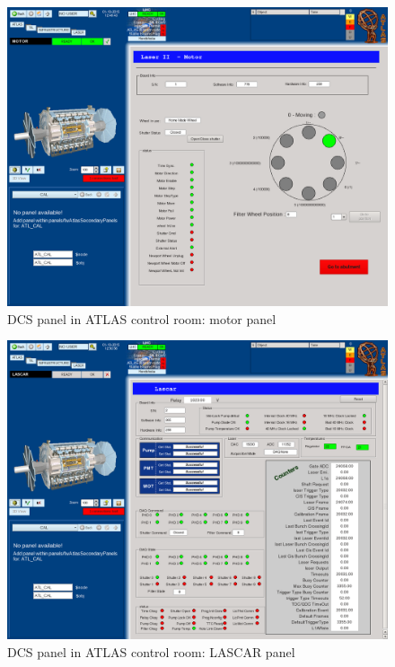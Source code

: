 \begin{appendices}
\begin{figure}[htbp]
\centering
\includegraphics[width=16cm]{figures/dcs_cr_motor.png}
\caption{DCS panel in ATLAS control room: motor panel}\label{fig:dcs_cr_d}
\end{figure}

\begin{figure}[htbp]
\centering
\includegraphics[width=16cm]{figures/dcs_cr_lascar.png}
\caption{DCS panel in ATLAS control room: LASCAR panel}\label{fig:dcs_cr_e}
\end{figure}

\newpage
\end{appendices}